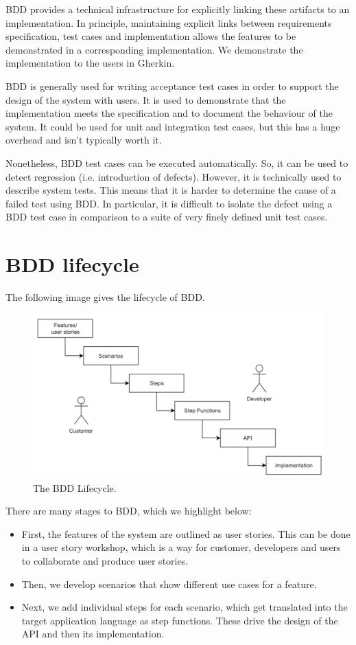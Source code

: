 \documentclass[a4paper, openany]{memoir}
\begin{document}
BDD provides a technical infrastructure for explicitly linking these artifacts to an implementation. In principle, maintaining explicit links between requirements specification, test cases and implementation allows the features to be demonstrated in a corresponding implementation. We demonstrate the implementation to the users in Gherkin.

BDD is generally used for writing acceptance test cases in order to support the design of the system with users. It is used to demonstrate that the implementation meets the specification and to document the behaviour of the system. It could be used for unit and integration test cases, but this has a huge overhead and isn't typically worth it.

Nonetheless, BDD test cases can be executed automatically. So, it can be used to detect regression (i.e. introduction of defects). However, it is technically used to describe system tests. This means that it is harder to determine the cause of a failed test using BDD. In particular, it is difficult to isolate the defect using a BDD test case in comparison to a suite of very finely defined unit test cases.

\section{BDD lifecycle}
The following image gives the lifecycle of BDD.
\begin{figure}[H]
    \centering
    \includegraphics[scale=0.5]{src/11 BDD Lifecycle.PNG}
    \caption{The BDD Lifecycle.}
\end{figure}
\noindent There are many stages to BDD, which we highlight below:
\begin{itemize}
    \item First, the features of the system are outlined as user stories. This can be done in a user story workshop, which is a way for customer, developers and users to collaborate and produce user stories.
    
    \item Then, we develop scenarios that show different use cases for a feature.
    
    \item Next, we add individual steps for each scenario, which get translated into the target application language as step functions. These drive the design of the API and then its implementation.
\end{itemize}
\end{document}
